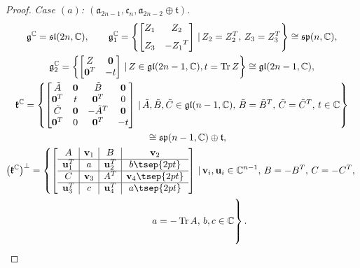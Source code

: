 \documentclass[pdftex]{sigma}
\numberwithin{equation}{section}
\begin{document}
\begin{proof}
 \emph{Case $(a)$: $(\mathfrak{a}_{2n-1},\mathfrak{c}_n,\mathfrak{a}_{2n-2}\oplus \mathfrak{t})$.} %
\begin{gather*}\mathfrak{g}^\mathbb{C}=\mathfrak{sl}(2n,\mathbb{C}),\qquad
\mathfrak{g}_1^\mathbb{C} = \left\{ \left[ \begin{matrix} Z_{1}&Z_{2}\\ \noalign{\medskip}Z_{3}&-{Z_{1}}^{T}\end{matrix} \right] \,|\, Z_2=Z_2^T, \, Z_3=Z_3^T \right\} \cong \mathfrak{sp}(n,\mathbb{C}),
\\
\mathfrak{g}_2^\mathbb{C}=\left\{ \left[
\begin{matrix}
Z & \mathbf{0}\\
\mathbf{0}^T & -t
\end{matrix} \right] \,|\, Z \in \mathfrak{gl}(2n-1,\mathbb{C}), t=\operatorname{Tr} Z \right\}\cong \mathfrak{gl}(2n-1,\mathbb{C}) ,
\\
\mathfrak{k}^\mathbb{C}=\left\{
\left[ \begin{matrix}
\tilde{A} & \mathbf{0} & \tilde{B} & \mathbf{0} \\
\mathbf{0}^T & t & \mathbf{0}^T & 0 \\
\tilde{C} & \mathbf{0} & -\tilde{A}^T & \mathbf{0} \\
\mathbf{0}^T & 0 & \mathbf{0}^T & -t
\end{matrix}
\right] \,|\, \tilde{A},\tilde{B},\tilde{C} \in \mathfrak{gl}(n-1,\mathbb{C}), \, \tilde{B}=\tilde{B}^T, \, \tilde{C}=\tilde{C}^T,\, t\in\mathbb{C} \right\} \\
\hphantom{\mathfrak{k}^\mathbb{C}}{} \cong \mathfrak{sp}(n-1,\mathbb{C})\oplus \mathfrak{t},
\\
\big(\mathfrak{k}^\mathbb{C}\big)^\perp=
\left\{
\left[
\begin{array}{c|c|c|c}
A & \mathbf{v}_1 & B & \mathbf{v}_2 \\ \hline
\mathbf{u}_1^T & a & \mathbf{u}_2^T & b\tsep{2pt} \\ \hline
C & \mathbf{v}_3 & A^T & \mathbf{v}_4 \tsep{2pt}\\ \hline
\mathbf{u}_3^T & c & \mathbf{u}_4^T & a\tsep{2pt}
\end{array}
\right] \,|\, \mathbf{v}_i,\mathbf{u}_i \in \mathbb{C}^{n-1},\, B=-B^T, \,C=-C^T,\right.\\
\left. \hphantom{\big(\mathfrak{k}^\mathbb{C}\big)^\perp=}{}a=-\operatorname{Tr} A,\, b, c \in \mathbb{C}
\vphantom{\begin{array}{c|c|c|c}
A & \mathbf{v}_1 & B & \mathbf{v}_2 \\ \hline
\mathbf{u}_1^T & a & \mathbf{u}_2^T & b\tsep{2pt} \\ \hline
C & \mathbf{v}_3 & A^T & \mathbf{v}_4 \tsep{2pt}\\ \hline
\mathbf{u}_3^T & c & \mathbf{u}_4^T & a\tsep{2pt}
\end{array}}
\right\}.
\end{gather*}


\end{proof}
\end{document}
